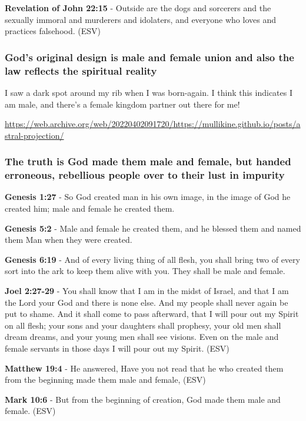 \documentclass[11pt]{article}
\begin{document}
\textbf{Revelation of John 22:15} - Outside are the dogs and sorcerers and the sexually immoral and murderers and idolaters, and everyone who loves and practices falsehood. (ESV)

\subsubsection{God's original design is male and female union and also the law reflects the spiritual reality}
\label{sec:orgacc4a02}

I saw a dark spot around my rib when I was born-again.
I think this indicates I am male, and there's a female kingdom partner out there for me!

\url{https://web.archive.org/web/20220402091720/https://mullikine.github.io/posts/astral-projection/}

\subsubsection{The truth is God made them male and female, but handed erroneous, rebellious people over to their lust in impurity}
\label{sec:org2559ba2}
\textbf{Genesis 1:27} - So God created man in his own image, in the image of God he created him; male and female he created them.

\textbf{Genesis 5:2} - Male and female he created them, and he blessed them and named them Man when they were created.

\textbf{Genesis 6:19} - And of every living thing of all flesh, you shall bring two of every sort into the ark to keep them alive with you. They shall be male and female.

\textbf{Joel 2:27-29} - You shall know that I am in the midst of Israel, and that I am the Lord your God and there is none else. And my people shall never again be put to shame. And it shall come to pass afterward, that I will pour out my Spirit on all flesh; your sons and your daughters shall prophesy, your old men shall dream dreams, and your young men shall see visions. Even on the male and female servants in those days I will pour out my Spirit. (ESV)

\textbf{Matthew 19:4} - He answered, Have you not read that he who created them from the beginning made them male and female, (ESV)

\textbf{Mark 10:6} - But from the beginning of creation, God made them male and female. (ESV)
\end{document}
